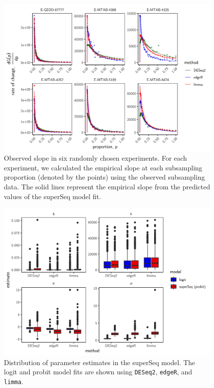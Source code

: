 \documentclass[11pt]{article}
\begin{document}
\begin{figure}[!ht]
\includegraphics[width = \textwidth]{../analysis/figures/figure4.png}
\centering
\caption{Observed slope in six randomly chosen experiments. For each experiment, we calculated the empirical slope at each subsampling proportion (denoted by the points) using the observed subsampling data. The solid lines represent the empirical slope from the predicted values of the superSeq model fit.}
\label{fig:fig4}
\end{figure}
\FloatBarrier

\begin{figure}[!ht]
\includegraphics[width = \textwidth]{../analysis/figures/figure5.png}
\centering
\caption{Distribution of parameter estimates in the superSeq model. The logit and probit model fits are shown using {\tt DESeq2}, {\tt edgeR}, and {\tt limma}.}
\label{fig:fig5}
\end{figure}
\FloatBarrier


\clearpage


\end{document}
